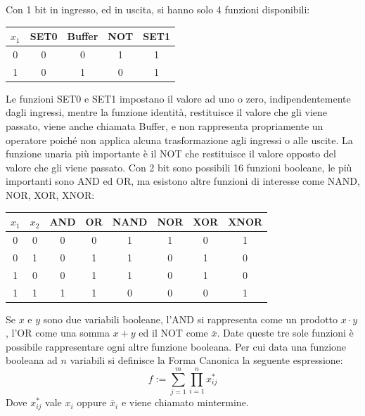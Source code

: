 \documentclass{article}
\numberwithin{equation}{subsection}
\begin{document}
Con 1 bit in ingresso, ed in uscita, si hanno solo 4 funzioni disponibili: 
\begin{center}
    \begin{tabular}{|c||c|c|c|c|}
        \hline
        $x_1$&SET0&Buffer&NOT&SET1\\
        \hline\hline
        0&0&0&1&1\\
        \hline
        1&0&1&0&1\\
        \hline
    \end{tabular}
\end{center}
Le funzioni SET0 e SET1 impostano il valore ad uno o zero, indipendentemente dagli ingressi, mentre la funzione identità, restituisce il valore che gli viene passato, viene anche chiamata Buffer, e non 
rappresenta propriamente un operatore poiché non applica alcuna trasformazione agli ingressi o alle uscite. La funzione unaria più importante è il 
NOT che restituisce il valore opposto del valore che gli viene passato. 
Con 2 bit sono possibili 16 funzioni booleane, le più importanti sono AND ed OR, ma esistono altre funzioni di interesse come NAND, NOR, XOR, XNOR:
\begin{center}
    \begin{tabular}{|c|c||c|c|c|c|c|c|}
        \hline
        $x_1$&$x_2$&AND&OR&NAND&NOR&XOR&XNOR\\
        \hline\hline
        0&0&0&0&1&1&0&1\\
        \hline
        0&1&0&1&1&0&1&0\\
        \hline
        1&0&0&1&1&0&1&0\\
        \hline
        1&1&1&1&0&0&0&1\\
        \hline
    \end{tabular}
\end{center}

Se $x$ e $y$ sono due variabili booleane, l'AND si rappresenta come un prodotto $x\cdot y$, l'OR come una somma $x+y$ ed il NOT come $\bar{x}$. Date queste tre sole funzioni è possibile rappresentare ogni altre 
funzione booleana. Per cui data una funzione booleana ad $n$ variabili si definisce la Forma Canonica la seguente espressione:
\begin{equation}
    f:=\sum_{j=1}^m\prod_{i=1}^nx_{ij}^*
\end{equation}
Dove $x_{ij}^*$ vale $x_i$ oppure $\bar{x}_i$ e viene chiamato mintermine. 
\end{document}
